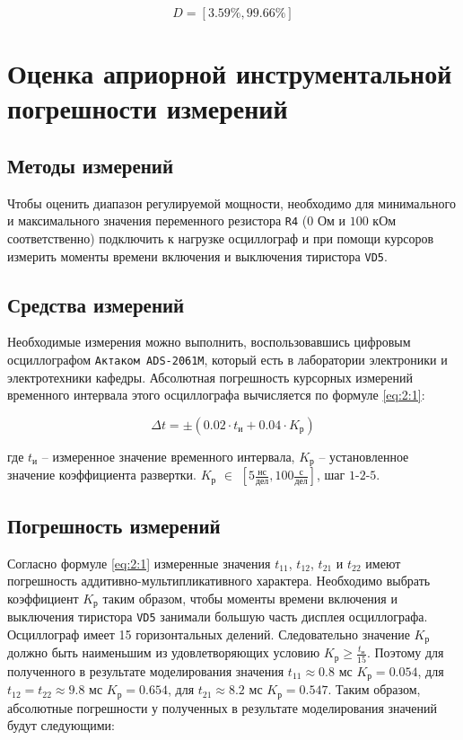 \begin{displaymath}
	D = [3.59\% , 99.66\% ]
\end{displaymath}

\section{Оценка априорной инструментальной погрешности измерений}

\subsection{Методы измерений}

Чтобы оценить диапазон регулируемой мощности, необходимо для минимального и максимального значения переменного резистора \verb+R4+ ($0$ Ом и $100$ кОм соответственно) подключить к нагрузке осциллограф и при помощи курсоров измерить моменты времени включения и выключения тиристора \verb+VD5+.

\subsection{Средства измерений}

Необходимые измерения можно выполнить, воспользовавшись цифровым осциллографом \verb+Актаком ADS-2061M+, который есть в лаборатории электроники и электротехники кафедры. Абсолютная погрешность курсорных измерений временного интервала этого осциллографа вычисляется по формуле \ref{eq:2:1}:

\begin{equation}
\label{eq:2:1}
	\Delta t = \pm \left(0.02 \cdot t_{\text{и}} + 0.04 \cdot K_{\text{р}} \right)
\end{equation}

\noindent где $t_{\text{и}}$ -- измеренное значение временного интервала, $K_{\text{р}}$ -- установленное значение коэффициента развертки. $K_{\text{р}}$ $\in$ $\left[5 \frac{\text{нс}}{\text{дел}} , 100 \frac{\text{с}}{\text{дел}}\right]$, шаг $1$-$2$-$5$.

\subsection{Погрешность измерений}

Согласно формуле \ref{eq:2:1} измеренные значения $t_{11}$, $t_{12}$, $t_{21}$ и $t_{22}$ имеют погрешность аддитивно-мультипликативного характера. Необходимо выбрать коэффициент $K_{\text{р}}$ таким образом, чтобы моменты времени включения и выключения тиристора \verb+VD5+ занимали большую часть дисплея осциллографа. Осциллограф имеет 15 горизонтальных делений. Следовательно значение $K_{\text{р}}$ должно быть наименьшим из удовлетворяющих условию $K_{\text{р}} \geq \frac{t_{\text{и}}}{15}$. Поэтому для полученного в результате моделирования значения $t_{11} \approx 0.8$ мс $K_{\text{р}} = 0.054$, для $t_{12} = t_{22} \approx 9.8$ мс $K_{\text{р}} = 0.654$, для $t_{21} \approx 8.2$ мс $K_{\text{р}} = 0.547$.
Таким образом, абсолютные погрешности у полученных в результате моделирования значений будут следующими:

